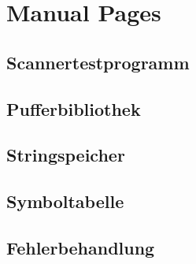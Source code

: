 \chapter{Manual Pages}
\section{Scannertestprogramm}

\newpage
\section{Pufferbibliothek}

\newpage
\section{Stringspeicher}

\newpage
\section{Symboltabelle}

\newpage
\section{Fehlerbehandlung}

